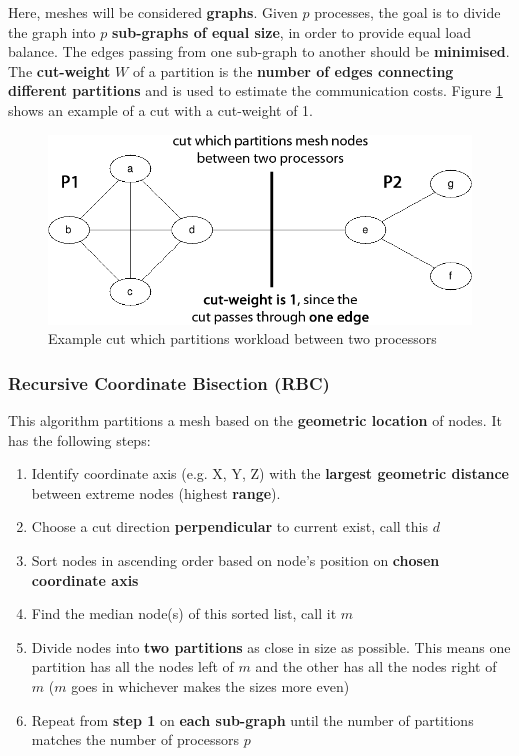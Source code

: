 \documentclass{article}
\begin{document}
Here, meshes will be considered \textbf{graphs}. Given $p$ processes, the goal is to divide the graph into $p$ \textbf{sub-graphs of equal size}, in order to provide equal load balance. The edges passing from one sub-graph to another should be \textbf{minimised}. The \textbf{cut-weight} $W$ of a partition is the \textbf{number of edges connecting different partitions} and is used to estimate the communication costs. Figure \ref{fig:example-cut} shows an example of a cut with a cut-weight of 1.

\begin{figure}
	\centering
	\includegraphics[scale=0.35]{figures/example-cut.png}
	\caption{Example cut which partitions workload between two processors}
	\label{fig:example-cut}
\end{figure}

\subsubsection{Recursive Coordinate Bisection (RBC)}

This algorithm partitions a mesh based on the \textbf{geometric location} of nodes. It has the following steps:
\begin{enumerate}
	\item Identify coordinate axis (e.g. X, Y, Z) with the \textbf{largest geometric distance} between extreme nodes (highest \textbf{range}).
	\item Choose a cut direction \textbf{perpendicular} to current exist, call this $d$
	\item Sort nodes in ascending order based on node's position on \textbf{chosen coordinate axis}
	\item Find the median node(s) of this sorted list, call it $m$
	\item Divide nodes into \textbf{two partitions} as close in size as possible. This means one partition has all the nodes left of $m$ and the other has all the nodes right of $m$ ($m$ goes in whichever makes the sizes more even)
	\item Repeat from \textbf{step 1} on \textbf{each sub-graph} until the number of partitions matches the number of processors $p$
\end{enumerate}
\end{document}
